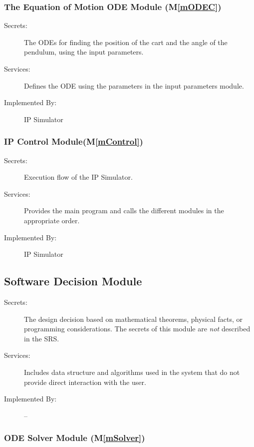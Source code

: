 \documentclass[12pt, titlepage]{article}
\newcommand{\mref}[1]{M\ref{#1}}
\begin{document}
\subsubsection{The Equation of Motion ODE Module (\mref{mODEC})}

\begin{description}
\item[Secrets:] The ODEs for finding the position of the cart and  the angle of the pendulum, using the input parameters.
\item[Services:] Defines the ODE using the parameters in the input parameters module.

\item[Implemented By:] IP Simulator
\end{description} 


\subsubsection{IP Control Module(\mref{mControl})}

\begin{description}
\item[Secrets:] Execution flow of the IP Simulator. 
\item[Services:] Provides the main program and calls the different modules in the appropriate order.
\item[Implemented By:] IP Simulator
\end{description} 


\subsection{Software Decision Module}

\begin{description}
\item[Secrets:] The design decision based on mathematical theorems, physical facts, or programming considerations. The secrets of this module are \emph{not} described in the SRS.
\item[Services:] Includes data structure and algorithms used in the system that do not provide direct interaction with the user. 
\item[Implemented By:] --
\end{description}
\subsubsection{ODE Solver Module (\mref{mSolver})}
\end{document}
